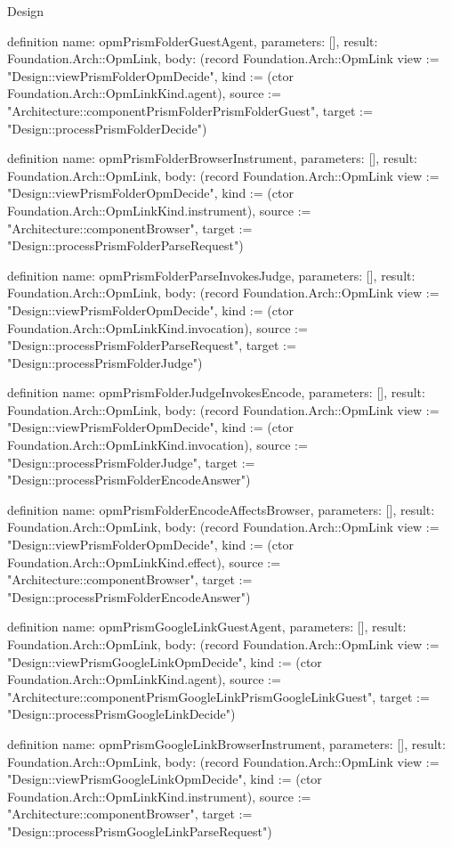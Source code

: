 \begin{lexlean}{Design}
\begin{semanticmodule}
definition{
  name: opmPrismFolderGuestAgent,
  parameters: [],
  result: Foundation.Arch::OpmLink,
  body: (record Foundation.Arch::OpmLink {view := "Design::viewPrismFolderOpmDecide", kind := (ctor Foundation.Arch::OpmLinkKind.agent), source := "Architecture::componentPrismFolderPrismFolderGuest", target := "Design::processPrismFolderDecide"})
}

definition{
  name: opmPrismFolderBrowserInstrument,
  parameters: [],
  result: Foundation.Arch::OpmLink,
  body: (record Foundation.Arch::OpmLink {view := "Design::viewPrismFolderOpmDecide", kind := (ctor Foundation.Arch::OpmLinkKind.instrument), source := "Architecture::componentBrowser", target := "Design::processPrismFolderParseRequest"})
}

definition{
  name: opmPrismFolderParseInvokesJudge,
  parameters: [],
  result: Foundation.Arch::OpmLink,
  body: (record Foundation.Arch::OpmLink {view := "Design::viewPrismFolderOpmDecide", kind := (ctor Foundation.Arch::OpmLinkKind.invocation), source := "Design::processPrismFolderParseRequest", target := "Design::processPrismFolderJudge"})
}

definition{
  name: opmPrismFolderJudgeInvokesEncode,
  parameters: [],
  result: Foundation.Arch::OpmLink,
  body: (record Foundation.Arch::OpmLink {view := "Design::viewPrismFolderOpmDecide", kind := (ctor Foundation.Arch::OpmLinkKind.invocation), source := "Design::processPrismFolderJudge", target := "Design::processPrismFolderEncodeAnswer"})
}

definition{
  name: opmPrismFolderEncodeAffectsBrowser,
  parameters: [],
  result: Foundation.Arch::OpmLink,
  body: (record Foundation.Arch::OpmLink {view := "Design::viewPrismFolderOpmDecide", kind := (ctor Foundation.Arch::OpmLinkKind.effect), source := "Architecture::componentBrowser", target := "Design::processPrismFolderEncodeAnswer"})
}

definition{
  name: opmPrismGoogleLinkGuestAgent,
  parameters: [],
  result: Foundation.Arch::OpmLink,
  body: (record Foundation.Arch::OpmLink {view := "Design::viewPrismGoogleLinkOpmDecide", kind := (ctor Foundation.Arch::OpmLinkKind.agent), source := "Architecture::componentPrismGoogleLinkPrismGoogleLinkGuest", target := "Design::processPrismGoogleLinkDecide"})
}

definition{
  name: opmPrismGoogleLinkBrowserInstrument,
  parameters: [],
  result: Foundation.Arch::OpmLink,
  body: (record Foundation.Arch::OpmLink {view := "Design::viewPrismGoogleLinkOpmDecide", kind := (ctor Foundation.Arch::OpmLinkKind.instrument), source := "Architecture::componentBrowser", target := "Design::processPrismGoogleLinkParseRequest"})
}


\end{semanticmodule}
\end{lexlean}
